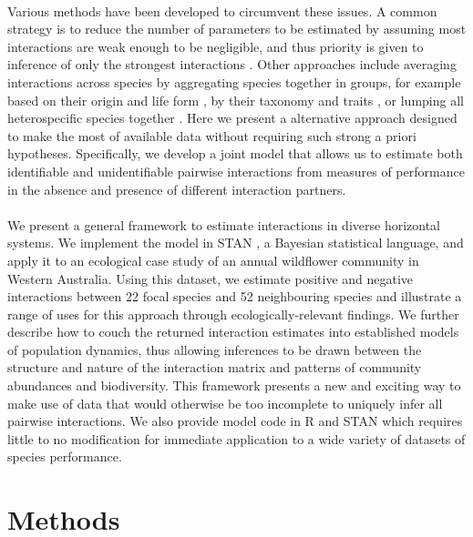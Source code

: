 \documentclass[a4,12pt]{article}
\begin{document}
\begin{refsection}
    \paragraph{}
    Various methods have been developed to circumvent these issues. A common strategy is to reduce the number of parameters to be estimated by assuming most interactions are weak enough to be negligible, and thus priority is given to inference of only the strongest interactions \parencite{Weiss-Lehman2022}. Other approaches include averaging interactions across species by aggregating species together in groups, for example based on their origin and life form \parencite{Martyn2021}, by their taxonomy and traits \parencite{Uriarte2004}, or lumping all heterospecific species together \parencite{Chu2015}. Here we present a alternative approach designed to make the most of available data without requiring such strong a priori hypotheses. Specifically, we develop a joint model that allows us to estimate both identifiable and unidentifiable pairwise interactions from measures of performance in the absence and presence of different interaction partners.

    \paragraph{} 
    We present a general framework to estimate interactions in diverse horizontal systems. We implement the model in STAN \parencite{Carpenter2017}, a Bayesian statistical language, and apply it to an ecological case study of an annual wildflower community in Western Australia. Using this dataset, we estimate positive and negative interactions between 22 focal species and 52 neighbouring species and illustrate a range of uses for this approach through ecologically-relevant findings. We further describe how to couch the returned interaction estimates into established models of population dynamics, thus allowing inferences to be drawn between the structure and nature of the interaction matrix and patterns of community abundances and biodiversity. This framework presents a new and exciting way to make use of data that would otherwise be too incomplete to uniquely infer all pairwise interactions. We also provide model code in R and STAN which requires little to no modification for immediate application to a wide variety of datasets of species performance.


\section{Methods}


\end{refsection}
\end{document}
